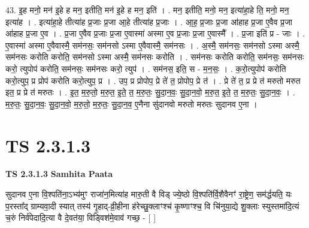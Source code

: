 \documentclass[17pt]{extarticle}
\begin{document}
43. इ॒ह मनो॒ मन॑ इ॒हे ह मन॒ इतीति॒ मन॑ इ॒हे ह मन॒ इति॑ । . मन॒ इतीति॒ मनो॒ मन॒ इत्या॑हा॒हे ति॒ मनो॒ मन॒ इत्या॑ह । . इत्या॑हा॒हे तीत्या॑ह प्र॒जाः प्र॒जा आ॒हे तीत्या॑ह प्र॒जाः । . आ॒ह॒ प्र॒जाः प्र॒जा आ॑हाह प्र॒जा ए॒वैव प्र॒जा आ॑हाह प्र॒जा ए॒व । . प्र॒जा ए॒वैव प्र॒जाः प्र॒जा ए॒वास्मा॑ अस्मा ए॒व प्र॒जाः प्र॒जा ए॒वास्मै᳚ । . प्र॒जा इति॑ प्र - जाः । . ए॒वास्मा॑ अस्मा ए॒वैवास्मै॒ सम॑नसः॒ सम॑नसो ऽस्मा ए॒वैवास्मै॒ सम॑नसः । . अ॒स्मै॒ सम॑नसः॒ सम॑नसो ऽस्मा अस्मै॒ सम॑नसः करोति करोति॒ सम॑नसो ऽस्मा अस्मै॒ सम॑नसः करोति । . सम॑नसः करोति करोति॒ सम॑नसः॒ सम॑नसः करो॒ त्युपोप॑ करोति॒ सम॑नसः॒ सम॑नसः करो॒ त्युप॑ । . सम॑नस॒ इति॒ स - म॒न॒सः॒ । . क॒रो॒त्युपोप॑ करोति करो॒त्युप॒ प्र प्रोप॑ करोति करो॒त्युप॒ प्र । . उप॒ प्र प्रोपोप॒ प्रे ते॑ त॒ प्रोपोप॒ प्रे त॑ । . प्रे ते॑ त॒ प्र प्रे त॑ मरुतो मरुत इत॒ प्र प्रे त॑ मरुतः । . इ॒त॒ म॒रु॒तो॒ म॒रु॒त॒ इ॒ते॒ त॒ म॒रु॒तः॒ सु॒दा॒न॒वः॒ सु॒दा॒न॒वो॒ म॒रु॒त॒ इ॒ते॒ त॒ म॒रु॒तः॒ सु॒दा॒न॒वः॒ । . म॒रु॒तः॒ सु॒दा॒न॒वः॒ सु॒दा॒न॒वो॒ म॒रु॒तो॒ म॒रु॒तः॒ सु॒दा॒न॒व॒ ए॒नैना सु॑दानवो मरुतो मरुतः सुदानव ए॒ना । \newline
\pagebreak
{}

\section{ TS 2.3.1.3 }

\textbf{TS 2.3.1.3 } \newline
\textbf{Samhita Paata} \newline

सुदानव ए॒ना वि॒श्पति॑ना॒ऽभ्य॑मुꣳ राजा॑न॒मित्या॑ह मारु॒ती वै विड् ज्ये॒ष्ठो वि॒श्पति॑र्वि॒शैवैनꣳ॑ रा॒ष्ट्रेण॒ सम॑र्द्धयति॒ यः प॒रस्ता᳚द् ग्राम्यवा॒दी स्यात् तस्य॑ गृ॒हाद्-व्री॒हीना ह॑रेच्छु॒क्लाꣳश्च॑ कृ॒ष्णाꣳश्च॒ वि चि॑नुया॒द्ये शु॒क्लाः स्युस्तमा॑दि॒त्यं च॒रुं निर्व॑पेदादि॒त्या वै दे॒वत॑या॒ विड्विश॑मे॒वाव॑ गच्छ॒ - [  ] \newline
\end{document}
